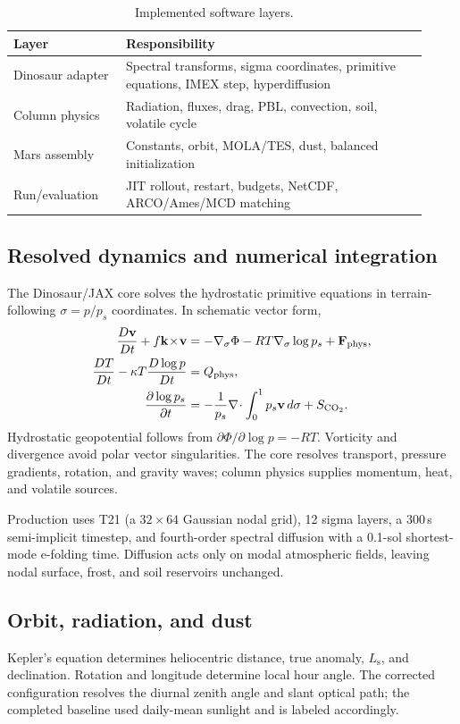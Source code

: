 \documentclass{article}
\newcommand{\Ls}{L_\mathrm{s}}
\begin{document}
\begin{table}[t]\centering\small
\caption{Implemented software layers.}\label{tab:framework}
\begin{tabular}{p{0.25\linewidth}p{0.67\linewidth}}\toprule
Layer & Responsibility\\\midrule
Dinosaur adapter & Spectral transforms, sigma coordinates, primitive equations,
IMEX step, hyperdiffusion\\
Column physics & Radiation, fluxes, drag, PBL, convection, soil, volatile cycle\\
Mars assembly & Constants, orbit, MOLA/TES, dust, balanced initialization\\
Run/evaluation & JIT rollout, restart, budgets, NetCDF, ARCO/Ames/MCD matching\\\bottomrule
\end{tabular}
\end{table}

\subsection{Resolved dynamics and numerical integration}
The Dinosaur/JAX core \citep{dinosaur2024,jax2018} solves the hydrostatic
primitive equations in terrain-following \(\sigma=p/p_s\) coordinates. In
schematic vector form,
\begin{align}
\frac{D\mathbf v}{Dt}+f\mathbf k\!\times\!\mathbf v
 &= -\nabla_\sigma\Phi-RT\nabla_\sigma\log p_s+\mathbf F_{\rm phys},\\
\frac{DT}{Dt}-\kappa T\frac{D\log p}{Dt}&=Q_{\rm phys},\\
\frac{\partial\log p_s}{\partial t}
 &= -\frac{1}{p_s}\nabla\!\cdot\int_0^1p_s\mathbf v\,d\sigma+S_{\rm CO_2}.
\end{align}
Hydrostatic geopotential follows from \(\partial\Phi/\partial\log p=-RT\).
Vorticity and divergence avoid polar vector singularities. The core resolves
transport, pressure gradients, rotation, and gravity waves; column physics
supplies momentum, heat, and volatile sources.

Production uses T21 (a \(32\times64\) Gaussian nodal grid), 12 sigma layers, a
300\,s semi-implicit timestep, and fourth-order spectral diffusion with a
0.1-sol shortest-mode e-folding time. Diffusion acts only on modal atmospheric
fields, leaving nodal surface, frost, and soil reservoirs unchanged.

\subsection{Orbit, radiation, and dust}
Kepler's equation determines heliocentric distance, true anomaly, \(\Ls\), and
declination. Rotation and longitude determine local hour angle. The corrected
configuration resolves the diurnal zenith angle and slant optical path; the
completed baseline used daily-mean sunlight and is labeled accordingly.
\end{document}
